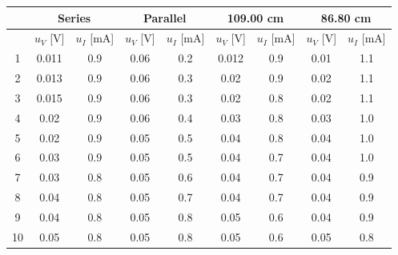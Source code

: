 \documentclass{article}
\begin{document}
{\begin{appendix}
\begin{table}[H]\centering
    \begin{tabular}{c|cc||cc||cc||cc}
        \toprule
   & \multicolumn{2}{c||}{\textbf{Series}} & \multicolumn{2}{c||}{\textbf{Parallel}} & \multicolumn{2}{c||}{\textbf{109.00 cm}} & \multicolumn{2}{c}{\textbf{86.80 cm}} \\
        \midrule
           & $u_V$ [V]                    & $u_I$ [mA]                     & $u_V$ [V]                      & $u_I$ [mA]                   & $u_V$ [V] & $u_I$ [mA] & $u_V$ [V] & $u_I$ [mA] \\
        \midrule
1  & 0.011            & 0.9              & 0.06              & 0.2               & 0.012              & 0.9               & 0.01              & 1.1               \\
2  & 0.013            & 0.9              & 0.06              & 0.3               & 0.02               & 0.9               & 0.02              & 1.1               \\
3  & 0.015            & 0.9              & 0.06              & 0.3               & 0.02               & 0.8               & 0.02              & 1.1               \\
4  & 0.02             & 0.9              & 0.06              & 0.4               & 0.03               & 0.8               & 0.03              & 1.0               \\
5  & 0.02             & 0.9              & 0.05              & 0.5               & 0.04               & 0.8               & 0.04              & 1.0               \\
6  & 0.03             & 0.9              & 0.05              & 0.5               & 0.04               & 0.7               & 0.04              & 1.0               \\
7  & 0.03             & 0.8              & 0.05              & 0.6               & 0.04               & 0.7               & 0.04              & 0.9               \\
8  & 0.04             & 0.8              & 0.05              & 0.7               & 0.04               & 0.7               & 0.04              & 0.9               \\
9  & 0.04             & 0.8              & 0.05              & 0.8               & 0.05               & 0.6               & 0.04              & 0.9               \\
10 & 0.05             & 0.8              & 0.05              & 0.8               & 0.05               & 0.6               & 0.05              & 0.8               \\

\end{tabular}
\end{table}
\end{appendix}}
\end{document}
